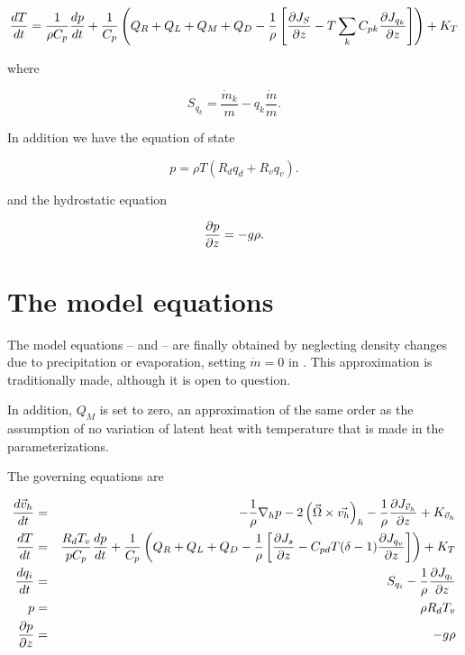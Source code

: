 \begin{equation}
\frac{dT}{dt}=\frac{1}{\rho 
C_{p}}\frac{dp}{dt}+\frac{1}{C_{p}}\left(Q_{R}+Q_{L}
+Q_{M}+Q_{D}-\frac{1}{\rho}\left[\frac {\partial J_{S}} {\partial z}-T\sum_{k}C_{pk}\frac {\partial J_{q_{k}}} {\partial z}
\right ]\right)+K_{T}\label{A.6.4}
\end{equation}

where

\begin{equation}
S_{q_{k}}=\frac{\dot{m}_{k}}{m}-q_{k}\frac{\dot{m}}{m}\label{A.6.5}.
\end{equation}

In addition we have the equation of state

\begin{equation}
p=\rho T\left(R_{d}q_{d}+R_{v}q_{v}\right)\label{A.6.6}.
\end{equation}

and the hydrostatic equation

\begin{equation}
\frac {\partial p} {\partial z}=-g\rho\label{A.6.7}.
\end{equation}

\section{The model equations}\label{sA.7}

The model equations -- and
-- are finally obtained by neglecting
density changes due to precipitation or evaporation, setting
$\dot{m}=0$ in . This approximation is traditionally made,
although it is open to question.

In addition, $Q_{M}$ is set to zero, an approximation of the same
order as the assumption of no variation of latent heat with
temperature that is made in the parameterizations.

The governing equations are

\begin{eqnarray}
\frac{d\vec{v}_{h}}{dt}
&=&-\frac{1}{\rho}\nabla_{h}p-2\left(\vec{\Omega}\times\vec{v_{h}}\right)_{h}-
\frac{1}{\rho}\frac {\partial J_{\vec{v}_{h}}} {\partial z}+K_{\vec{v}_{h}}\label{A.7.1}\\
\frac{dT}{dt}
&=&\frac{R_{d}T_{v}}{pC_{p}}\frac{dp}{dt}+\frac{1}{C_{p}}\left(Q_{R}+
Q_{L}+Q_{D}-\frac{1}{\rho}\left[\frac {\partial J_{s}} {\partial z}-C_{pd}T(\delta
-1)\frac {\partial J_{q_{v}}} {\partial z}\right]\right)+K_{T}\label{A.7.2}\\
\frac{dq_{i}}{dt}
&=&S_{q_{i}}-\frac{1}{\rho}\frac {\partial J_{q_{i}}} {\partial z}\label{A.7.3}\\
p&=&\rho R_{d}T_{v}\label{A.7.5}\\
\frac {\partial p} {\partial z}&=&-g\rho\label{A.7.6}
\end{eqnarray}

